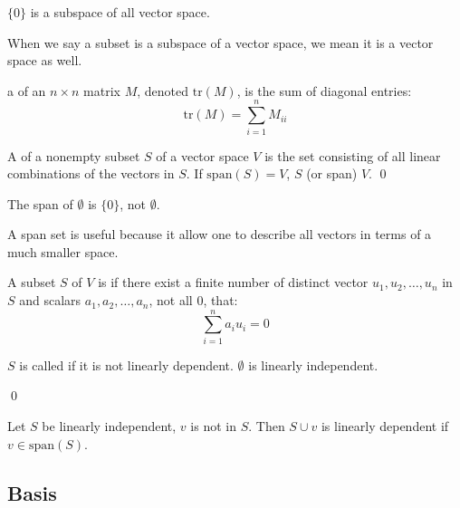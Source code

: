 \begin{theorem}
    $\{0\}$ is a subspace of all vector space.    
\end{theorem}


When we say a subset is a subspace of a vector space, we mean it is a vector space as well.

\begin{definition}
	a  of an $n \times n$ matrix $M$, denoted $\text{tr}(M)$, is the sum of diagonal entries:
	\begin{equation}
		\text{tr}(M) = \sum_{i=1}^n M_{ii}
	\end{equation}
\end{definition}

\begin{definition}
	A  of a nonempty subset $S$ of a vector space $V$ is the set consisting of all linear combinations of the vectors in $S$. If $\text{span}(S) =V$, $S$  (or span) $V$.
	\qed
\end{definition}

\begin{definition}
    The span of $\emptyset$ is $\{0\}$, not $\emptyset$.
\end{definition}

A span set is useful because it allow one to describe all vectors in terms of a much smaller space.

\begin{definition}
	A subset $S$ of $V$ is  if there exist a finite number of distinct vector $u_1, u_2, \dots, u_n$ in $S$ and scalars $a_1, a_2, \dots, a_n$, not all $0$, that:
	\begin{equation}
		\sum_{i=1}^n a_i u_i = 0
	\end{equation}
	
	$S$ is called  if it is not linearly dependent. $\emptyset$ is linearly independent.
	
	\qed
\end{definition}

\begin{theorem}
	Let $S$ be linearly independent, $v$ is not in $S$. Then $S \cup {v} $ is linearly dependent if $v \in \text{span}(S)$.
\end{theorem}

\subsection{Basis}

